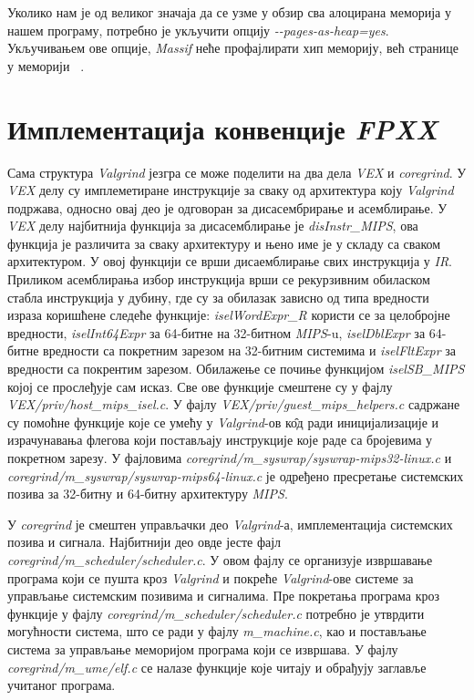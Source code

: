 \documentclass[12pt,oneside]{memoir}
\begin{document}
\indent Уколико нам је од великог значаја да се узме у обзир сва алоцирана меморија у нашем програму, потребно је укључити опцију \textit{-\--pages-as-heap=yes}. Укључивањем ове опције, \textit{Massif} неће профајлирати хип меморију, већ странице у меморији ~\cite{massifdRef}. 


\chapter{Имплементација конвенције \textit{FPXX}}
\label{chp:fpxx}

\indent Сама структура \textit{Valgrind} језгра се може поделити на два дела \textit{VEX} и \textit{coregrind}. У \textit{VEX} делу су имплеметиране инструкције за сваку од архитектура коју \textit{Valgrind} подржава, односно овај део је одговоран за дисасембрирање и асемблирање. У \textit{VEX} делу најбитнија функција за дисасемблирање је \textit{disInstr\_MIPS}, ова функција је различита за сваку архитектуру и њено име је у складу са сваком архитектуром. У овој функцији се врши дисаемблирање свих инструкција у \textit{IR}. Приликом асемблирања избор инструкција врши се рекурзивним обиласком стабла инструкција у дубину, где су за обилазак зависно од типа вредности израза коришћене следеће функције: \textit{iselWordExpr\_R} користи се за целобројне вредности,  \textit{iselInt64Expr} за 64-битне на 32-битном \textit{MIPS}-u, \textit{iselDblExpr} за 64-битне вредности са покретним зарезом на 32-битним системима и \textit{iselFltExpr} за вредности са покрентим зарезом. Обилажење се почиње функцијом \textit{iselSB\_MIPS} којој се прослеђује сам исказ. Све ове функције смештене су у фајлу 
\textit{VEX/priv/\-host\_mips\_isel.c}. У фајлу \textit{VEX/priv/guest\_mips\_helpers.c} садржане су помоћне функције које се умећу у \textit{Valgrind}-ов к\^{о}д ради иницијализације и израчунавања флегова који постављају инструкције које раде са бројевима у покретном зарезу. У фајловима \textit{coregrind/m\_syswrap/syswrap-mips32-linux.c} и \textit{coregrind/m\_syswrap\-/syswrap-mips64-linux.c} је одређено пресретање системских позива за 32-битну и 64-битну архитектуру \textit{MIPS}.


\indent У \textit{coregrind} је смештен управљачки део \textit{Valgrind}-а, имплементација системских позива и сигнала. Најбитнији део овде јесте фајл  \textit{coregrind/m\_scheduler/\-scheduler.c}. У овом фајлу се организује извршавање програма који се пушта кроз \textit{Valgrind} и покреће \textit{Valgrind}-ове системе за управљање системским позивима и сигналима. Пре покретања програма кроз функције у фајлу \textit{coregrind/\-m\_scheduler/scheduler.c} потребно је утврдити могућности система, што се ради у фајлу \textit{m\_machine.c}, као и постављање система за управљање меморијом програма који се извршава. У фајлу \textit{coregrind/m\_ume/elf.c} се налазе функције које читају и обрађују заглавље учитаног програма. 
\end{document}
